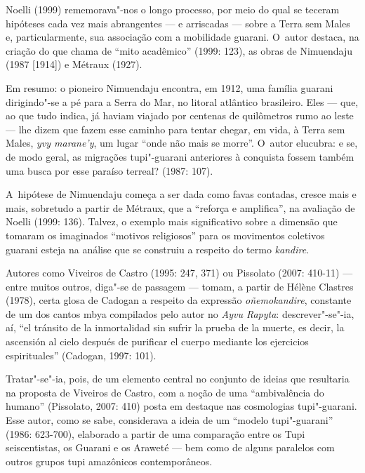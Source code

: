 Noelli (1999) rememorava"-nos o longo processo, por meio do qual se
teceram hipóteses cada vez mais abrangentes --- e arriscadas --- sobre a
Terra sem Males e, particularmente, sua associação com a mobilidade
guarani. O~autor destaca, na criação do que chama de ``mito acadêmico''
(1999: 123), as obras de Nimuendaju (1987 [1914]) e Métraux (1927).

Em resumo: o pioneiro Nimuendaju encontra, em 1912, uma família guarani
dirigindo"-se a pé para a Serra do Mar, no litoral atlântico brasileiro.
Eles --- que, ao que tudo indica, já haviam viajado por centenas de
quilômetros rumo ao leste --- lhe dizem que fazem esse caminho para
tentar chegar, em vida, à Terra sem Males, \emph{yvy marane’y}, um lugar ``onde
não mais se morre''. O~autor elucubra: e se, de modo geral, as migrações
tupi"-guarani anteriores à conquista fossem também uma busca por esse
paraíso terreal? (1987: 107).

A~hipótese de Nimuendaju começa a ser dada como favas contadas, cresce
mais e mais, sobretudo a partir de Métraux, que a ``reforça e
amplifica'', na avaliação de Noelli (1999: 136). Talvez, o exemplo mais
significativo sobre a dimensão que tomaram os imaginados ``motivos
religiosos'' para os movimentos coletivos guarani esteja na análise que
se construiu a respeito do termo \emph{kandire}.

Autores como Viveiros de Castro (1995: 247, 371) ou Pissolato (2007:
410-11) --- entre muitos outros, diga"-se de passagem --- tomam, a partir de
Hélène Clastres (1978), certa glosa de Cadogan a respeito da expressão
\emph{oñemokandire}, constante de um dos cantos mbya compilados pelo autor no
\emph{Ayvu Rapyta}: descrever"-se"-ia, aí, ``el tránsito de la inmortalidad sin
sufrir la prueba de la muerte, es decir, la ascensión al cielo después
de purificar el cuerpo mediante los ejercicios espirituales'' (Cadogan,
1997: 101). 

Tratar"-se"-ia, pois, de um elemento central no conjunto de ideias que
resultaria na proposta de Viveiros de Castro, com a noção de uma
``ambivalência do humano'' (Pissolato, 2007: 410) posta em destaque nas
cosmologias tupi"-guarani. Esse autor, como se sabe, considerava a ideia
de um ``modelo tupi"-guarani'' (1986: 623-700), elaborado a partir de uma
comparação entre os Tupi seiscentistas, os Guarani e os Araweté --- bem
como de alguns paralelos com outros grupos tupi amazônicos
contemporâneos.

